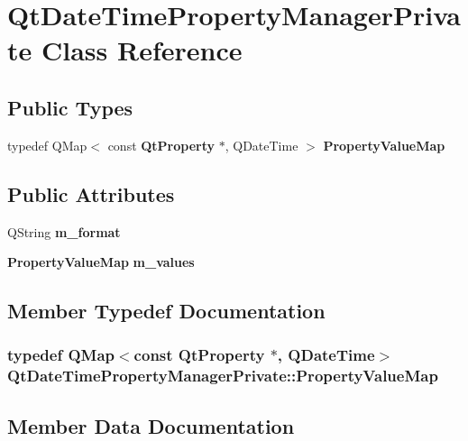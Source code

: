 \section{Qt\+Date\+Time\+Property\+Manager\+Private Class Reference}
\label{classQtDateTimePropertyManagerPrivate}
\subsection*{Public Types}
\begin{DoxyCompactItemize}
\item 
typedef Q\+Map$<$ const {\bf Qt\+Property} $\ast$, Q\+Date\+Time $>$ {\bf Property\+Value\+Map}
\end{DoxyCompactItemize}
\subsection*{Public Attributes}
\begin{DoxyCompactItemize}
\item 
Q\+String {\bf m\+\_\+format}
\item 
{\bf Property\+Value\+Map} {\bf m\+\_\+values}
\end{DoxyCompactItemize}


\subsection{Member Typedef Documentation}
\subsubsection[{Property\+Value\+Map}]{\setlength{\rightskip}{0pt plus 5cm}typedef Q\+Map$<$const {\bf Qt\+Property} $\ast$, Q\+Date\+Time$>$ {\bf Qt\+Date\+Time\+Property\+Manager\+Private\+::\+Property\+Value\+Map}}\label{classQtDateTimePropertyManagerPrivate_a00656551eaa8a6c1385b65e87b76396b}


\subsection{Member Data Documentation}
